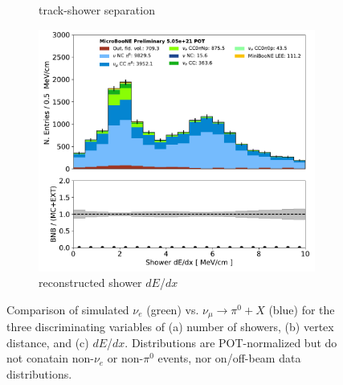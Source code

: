 \documentclass[a4paper]{article}
\begin{document}
\begin{figure}[ht]
\begin{center}
\begin{subfigure}[b]{0.31\textwidth}
    \caption{track-shower separation}
    \end{subfigure}
    \begin{subfigure}[b]{0.31\textwidth}
    \centering
    \includegraphics[width=1.00\textwidth]{egamma/shr_tkfit_dedx_Y_01022020.pdf}
    \caption{\label{fig:egammasep:dedx} reconstructed shower $dE$/$dx$}
    \end{subfigure}
\caption{\label{fig:egammasep}Comparison of simulated $\nu_e$ (green) vs. $\nu_{\mu} \rightarrow \pi^0 + X$ (blue) for the three discriminating variables of (a) number of showers, (b) vertex distance, and (c) $dE$/$dx$. Distributions are POT-normalized but do not conatain non-$\nu_e$ or non-$\pi^0$ events, nor on/off-beam data distributions.}
\end{center}
\end{figure}
\end{document}
